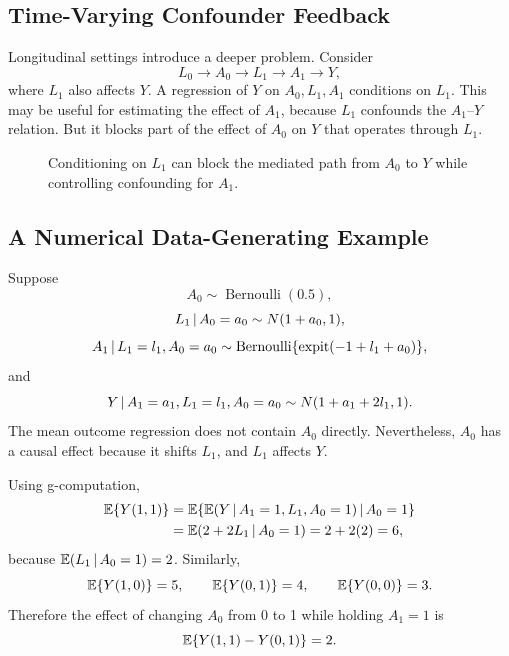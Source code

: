 \subsection{Time-Varying Confounder Feedback}

Longitudinal settings introduce a deeper problem. Consider
\[
  L_0 \rightarrow A_0 \rightarrow L_1 \rightarrow A_1 \rightarrow Y,
\]
where $L_1$ also affects $Y$. A regression of $Y$ on $A_0,L_1,A_1$ conditions
on $L_1$. This may be useful for estimating the effect of $A_1$, because $L_1$
confounds the $A_1$--$Y$ relation. But it blocks part of the effect of $A_0$ on
$Y$ that operates through $L_1$.

\begin{figure}[H]
\centering
{}
\caption{Conditioning on $L_1$ can block the mediated path from $A_0$ to $Y$ while controlling confounding for $A_1$.}
\label{fig:ch8-naive-blocking}
\end{figure}

\subsection{A Numerical Data-Generating Example}

Suppose
\[
  A_0\sim \operatorname{Bernoulli}(0.5),
\]
\[
  L_1\,\vert\, A_0=a_0 \sim N(1+a_0,1),
\]
\[
  A_1\,\vert\, L_1=l_1,A_0=a_0
  \sim \operatorname{Bernoulli}\{\operatorname{expit}(-1+l_1+a_0)\},
\]
and
\[
  Y\,\vert\, A_1=a_1,L_1=l_1,A_0=a_0
  \sim N(1+a_1+2l_1,1).
\]
The mean outcome regression does not contain $A_0$ directly. Nevertheless,
$A_0$ has a causal effect because it shifts $L_1$, and $L_1$ affects $Y$.

Using g-computation,
\[
\begin{aligned}
  \mathbb{E}\{Y(1,1)\}
  &=\mathbb{E}\{\mathbb{E}(Y\,\vert\, A_1=1,L_1,A_0=1)\,\vert\, A_0=1\}\\
  &=\mathbb{E}(2+2L_1\,\vert\, A_0=1)=2+2(2)=6,
\end{aligned}
\]
because $\mathbb{E}(L_1\,\vert\, A_0=1)=2$. Similarly,
\[
  \mathbb{E}\{Y(1,0)\}=5,\qquad
  \mathbb{E}\{Y(0,1)\}=4,\qquad
  \mathbb{E}\{Y(0,0)\}=3.
\]
Therefore the effect of changing $A_0$ from 0 to 1 while holding $A_1=1$ is
\[
  \mathbb{E}\{Y(1,1)-Y(0,1)\}=2.
\]

